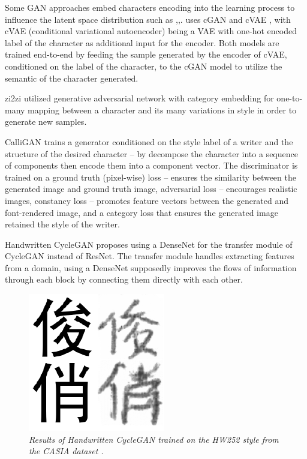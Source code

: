 \documentclass[12pt]{report}
\begin{document}
Some GAN approaches embed characters encoding into the learning process to influence the latent space distribution such as \cite{handwritten-cgan},\cite{zi2zi},\cite{calligan}. \cite{handwritten-cgan} uses cGAN \cite{cgan} and cVAE \cite{cvae}, with cVAE (conditional variational autoencoder) being a VAE with one-hot encoded label of the character as additional input for the encoder. Both models are trained end-to-end by feeding the sample generated by the encoder of cVAE, conditioned on the label of the character, to the cGAN model to utilize the semantic of the character generated.

zi2zi \cite{zi2zi} utilized generative adversarial network with category embedding for one-to-many mapping between a character and its many variations in style in order to generate new samples. 

CalliGAN \cite{calligan} trains a generator conditioned on the style label of a writer and the structure of the desired character – by decompose the character into a sequence of components then encode them into a component vector. The discriminator is trained on a ground truth (pixel-wise) loss – ensures the similarity between the generated image and ground truth image, adversarial loss – encourages realistic images, constancy loss – promotes feature vectors between the generated and font-rendered image, and a category loss that ensures the generated image retained the style of the writer.

Handwritten CycleGAN \cite{handwritten-cyclegan} proposes using a DenseNet for the transfer module of CycleGAN instead of ResNet. The transfer module handles extracting features from a domain, using a DenseNet supposedly improves the flows of information through each block by connecting them directly with each other.

\begin{figure}[h]
	\centering
	\includegraphics[scale=0.9]{handwritten-cycle-gan-result}
	\caption{\textit{Results of Handwritten CycleGAN \cite{handwritten-cyclegan} trained on the HW252 style from the CASIA dataset \cite{casia}.}}
	\label{fig:handwritten-cycle-gan-result}
\end{figure}
\end{document}
